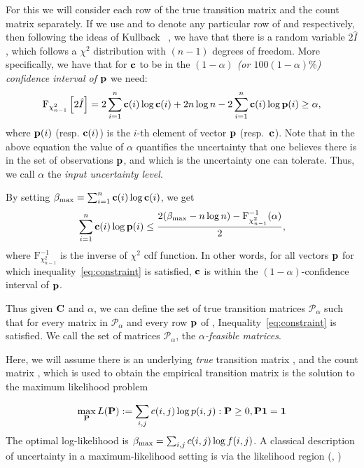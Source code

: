 For this we will consider each row of the true transition matrix and the count matrix
separately. If we use {\rowp} and {\rowc} to denote
any particular row of {\truetransitionmatrix} and {\countmatrix} respectively, then 
following the ideas of Kullback {\etal}~\cite{kullback62tests}, we have that 
there is a random variable $2\hat{I}$, which follows a $\chi^2$ distribution with $(n-1)$ degrees of freedom.
More specifically, we have that
for $\mathbf{c}$ to be in the  \emph{$(1-\alpha)$ (or $100(1-\alpha)\%$) 
confidence interval of $\mathbf{p}$} we need:
\begin{equation}\label{eq:ul}
\text{F}_{\chi^2_{n-1}}\left[2\hat{I}\right] =  2\sum_{i=1}^n\mathbf{c}(i)\log\mathbf{c}(i)+2n\log n -2\sum_{i=1}^n\mathbf{c}(i)\log\mathbf{p}(i) \geq \alpha,
\end{equation}
where 
 $\mathbf{p}(i)$ (resp. $\mathbf{c}(i)$) is the $i$-th element of vector $\mathbf{p}$ (resp.\ $\mathbf{c}$).
 Note that in the above equation the value of $\alpha$ quantifies the uncertainty that
 one believes there is in the set of observations $\mathbf{p}$, and which is the uncertainty one
 can tolerate. Thus, we call $\alpha$ the \emph{input uncertainty level}.
 
By setting $\beta_\text{max} = \sum_{i=1}^n\mathbf{c}(i)\log \mathbf{c}(i)$,
we get
\begin{equation}\label{eq:constraint}
\sum_{i=1}^n\mathbf{c}(i)\log\mathbf{p}(i) \leq \frac{2(\beta_\text{max}-n\log n)-\text{F}^{-1}_{\chi^2_{n-1}}(\alpha)}{2},
\end{equation}
where $\text{F}^{-1}_{\chi^2_{n-1}}$ is the inverse of $\chi^2$ cdf function. 
In other words, for all vectors $\mathbf{p}$ for which inequality~\eqref{eq:constraint}
is satisfied, $\mathbf{c}$ is within the $(1-\alpha)$-confidence interval of $\mathbf{p}$.

Thus given ${\mathbf{C}}$ and $\alpha$, we can define the 
set of true transition matrices $\mathcal{P}_{\alpha}$ such that
for every matrix {\truetransitionmatrix} in $\mathcal{P}_{\alpha}$
and every row $\mathbf{p}$ of {\truetransitionmatrix}, Inequality~\eqref{eq:constraint}
is satisfied.
We call the set of matrices $\mathcal{P}_{\alpha}$, the \emph{$\alpha$-feasible
matrices}.


\iffalse
{}
Here, we will assume there is an underlying \emph{true} transition matrix
{\truetransitionmatrix}, and the count matrix {\countmatrix}, which is used to 
obtain the empirical transition matrix {\empiricaltransitionmatrix} is the solution
to the maximum likelihood problem

\begin{equation}
\max_{\mathbf{P}} L({\mathbf{P}}) := \sum_{i,j}c(i,j) \log{p(i,j)} : {\mathbf{P}} \geq 0, {\mathbf{P}}\mathbf{1} = \mathbf{1} 
\end{equation}
The optimal log-likelihood is $\beta_{\textrm{max}}= \sum_{i,j}c(i,j)\log{f(i,j)}$.
A classical description of uncertainty in a maximum-likelihood setting is via the likelihood region (\citet{lehmann2006theory}, \citet{poor2013introduction})

